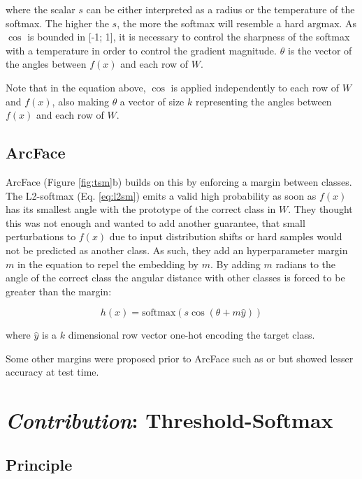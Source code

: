 where the scalar $s$ can be either interpreted as a radius or the temperature of the softmax. The higher the $s$, the more the softmax will resemble a hard $\text{argmax}$. As $\cos$ is bounded in [-1; 1], it is necessary to control the sharpness of the softmax with a temperature in order to control the gradient magnitude. $\theta$ is the vector of the angles between $f(x)$ and each row of $W$.

Note that in the equation above, $\cos$ is applied independently to each row of $W$ and $f(x)$, also making $\theta$ a vector of size $k$ representing the angles between $f(x)$ and each row of $W$.

\subsection{ArcFace}

ArcFace \cite{arcface} (Figure \ref{fig:tsm}b) builds on this by enforcing a margin between classes. The L2-softmax (Eq. \ref{eq:l2sm}) emits a valid high probability as soon as $f(x)$ has its smallest angle with the prototype of the correct class in $W$. They thought this was not enough and wanted to add another guarantee, that small perturbations to $f(x)$ due to input distribution shifts or hard samples would not be predicted as another class. As such, they add an hyperparameter margin $m$ in the equation to repel the embedding by $m$. By adding $m$ radians to the angle of the correct class the angular distance with other classes is forced to be greater than the margin:

\begin{equation}
    h(x) = \text{softmax}(s \cos(\theta + m\hat{y}))
\end{equation}

where $\hat{y}$ is a $k$ dimensional row vector one-hot encoding the target class.

Some other margins were proposed prior to ArcFace such as \citep{sphereface} or \citep{cosface} but showed lesser accuracy at test time.

\section{\arr \emph{Contribution}: Threshold-Softmax}

\subsection{Principle}

